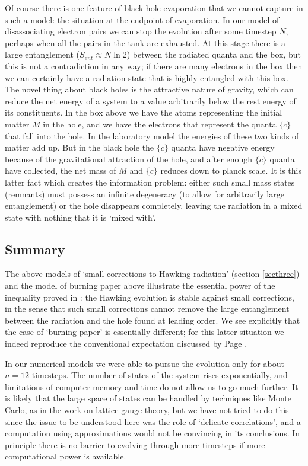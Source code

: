 \documentclass[12pt]{article}
\begin{document}
Of course there is one feature of black hole evaporation that we cannot capture in such a model: the situation at the endpoint of evaporation. In our model of disassociating electron pairs we can stop the evolution after some timestep $N$, perhaps when all the pairs in the tank are exhausted. At this stage there is a large entanglement ($S_{ent}\approx N\ln 2$) between the radiated quanta and the box, but this is not a contradiction in any way; if there are many electrons in the box then we can certainly have a radiation state that is highly entangled with this box. 
The novel thing about black holes is the attractive nature of gravity, which can reduce the net energy of a system to a value arbitrarily below the rest energy of its constituents. In the box above we have the atoms representing  the initial matter $M$ in the hole, and we have the electrons that represent the quanta $\{ c\}$ that fall into the hole. In the laboratory model the energies of these two kinds of matter add up. But in the black hole the $\{ c\}$ quanta have negative energy because of the gravitational attraction of the hole, and after enough $\{ c\}$ quanta have collected, the net mass of $M$ and $\{ c\}$ reduces down to planck scale. It is this latter fact which creates the information problem: either such small mass states (remnants) must possess an infinite degeneracy (to allow for arbitrarily large entanglement) or the hole disappears completely, leaving the radiation in a mixed state with nothing that it is `mixed with'. 

\subsection{Summary}

The above models of `small corrections to Hawking radiation' (section \ref{secthree}) and the model of burning paper above illustrate the essential power of the inequality proved in \cite{mathurfuzz}: the Hawking evolution is stable against small corrections, in the sense that such small corrections cannot remove the large entanglement between the radiation and the hole found at leading order. We see explicitly that the case of `burning paper' is essentially different; for this latter situation we indeed reproduce the conventional expectation discussed by Page \cite{page}. 

In our numerical models we were able to pursue the evolution only for about $n=12$ timesteps. The number of states of the system rises exponentially, and limitations of computer memory and time do not allow us to go much further. It is likely that the large space of states can be handled by techniques like Monte Carlo, as in the work on lattice gauge theory, but we have not tried to do this since the issue to be understood here was the role of `delicate correlations', and a computation using approximations would not be convincing in its conclusions. In principle there is no barrier to evolving through more timesteps if more computational power is available.
\end{document}
